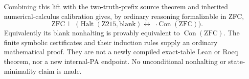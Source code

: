 Combining this lift with the two-truth-prefix source theorem and inherited
numerical-calculus calibration gives, by ordinary reasoning formalizable in
ZFC,
\[
 \mathrm{ZFC}\ \vdash\
 \bigl(\operatorname{Halt}(\mathrm{Z215},\mathrm{blank})
       \leftrightarrow\neg\operatorname{Con}(\mathrm{ZFC})\bigr).
\]
Equivalently its blank nonhalting is provably equivalent to
$\operatorname{Con}(\mathrm{ZFC})$.  The finite symbolic certificates and
their induction rules supply an ordinary mathematical proof.  They are not
a newly compiled exact-table Lean or Rocq theorem, nor a new internal-PA
endpoint.  No unconditional nonhalting or state-minimality claim is made.
